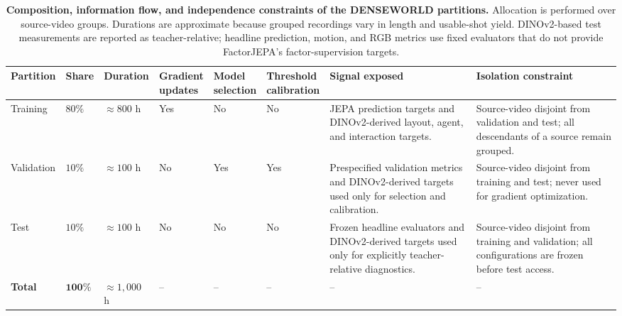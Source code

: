 \begin{table}[t]
\centering
\caption{
\textbf{Composition, information flow, and independence constraints of
the DENSEWORLD partitions.}
Allocation is performed over source-video groups. Durations are
approximate because grouped recordings vary in length and usable-shot
yield. DINOv2-based test measurements are reported as teacher-relative;
headline prediction, motion, and RGB metrics use fixed evaluators that
do not provide FactorJEPA's factor-supervision targets.
}
\label{tab:dataset_partitions}
\scriptsize
\setlength{\tabcolsep}{3pt}
\renewcommand{\arraystretch}{1.14}
\begin{tabular}{
    p{}
    p{}
    p{}
    p{}
    p{}
    p{}
    p{}
    p{}
}
\toprule
\textbf{Partition}
&
\textbf{Share}
&
\textbf{Duration}
&
\shortstack{\textbf{Gradient}\\\textbf{updates}}
&
\shortstack{\textbf{Model}\\\textbf{selection}}
&
\shortstack{\textbf{Threshold}\\\textbf{calibration}}
&
\textbf{Signal exposed}
&
\textbf{Isolation constraint}
\\
\midrule

Training
&
\(80\%\)
&
\(\approx800\) h
&
Yes
&
No
&
No
&
JEPA prediction targets and DINOv2-derived layout, agent, and
interaction targets.
&
Source-video disjoint from validation and test; all descendants of a
source remain grouped.
\\

Validation
&
\(10\%\)
&
\(\approx100\) h
&
No
&
Yes
&
Yes
&
Prespecified validation metrics and DINOv2-derived targets used only
for selection and calibration.
&
Source-video disjoint from training and test; never used for gradient
optimization.
\\

Test
&
\(10\%\)
&
\(\approx100\) h
&
No
&
No
&
No
&
Frozen headline evaluators and DINOv2-derived targets used only for
explicitly teacher-relative diagnostics.
&
Source-video disjoint from training and validation; all configurations
are frozen before test access.
\\

\midrule

\textbf{Total}
&
\(\mathbf{100\%}\)
&
\(\approx1{,}000\) h
&
-- & -- & -- & -- & --
\\

\bottomrule
\end{tabular}
\end{table}

